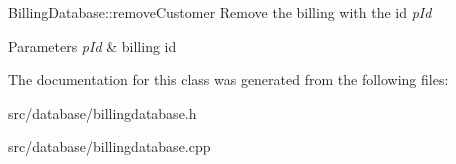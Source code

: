 Billing\+Database\+::remove\+Customer Remove the billing with the id {\itshape p\+Id} 


\begin{DoxyParams}{Parameters}
{\em p\+Id} & billing id \\
\hline
\end{DoxyParams}


The documentation for this class was generated from the following files\+:\begin{DoxyCompactItemize}
\item 
src/database/billingdatabase.\+h\item 
src/database/billingdatabase.\+cpp\end{DoxyCompactItemize}
